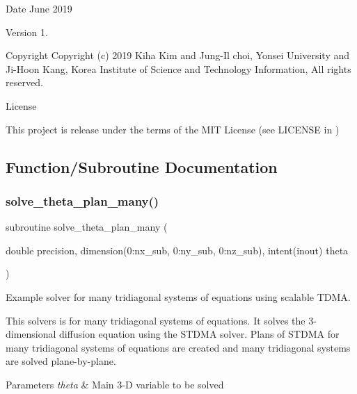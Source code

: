 \begin{DoxyDate}{Date}
June 2019 
\end{DoxyDate}
\begin{DoxyVersion}{Version}
1. 
\end{DoxyVersion}
\begin{DoxyParagraph}{Copyright}
Copyright (c) 2019 Kiha Kim and Jung-\/\+Il choi, Yonsei University and Ji-\/\+Hoon Kang, Korea Institute of Science and Technology Information, All rights reserved. 
\end{DoxyParagraph}
\begin{DoxyParagraph}{License }

\end{DoxyParagraph}
This project is release under the terms of the M\+IT License (see L\+I\+C\+E\+N\+SE in ) 

\subsection{Function/\+Subroutine Documentation}
\mbox{\label{solve__theta__plan__many_8f90_af048018fcdfbe66e00922dee3e7e9a64}} 
\subsubsection{\texorpdfstring{solve\_theta\_plan\_many()}{solve\_theta\_plan\_many()}}
{\footnotesize\ttfamily subroutine solve\+\_\+theta\+\_\+plan\+\_\+many (\begin{DoxyParamCaption}\item[{double precision, dimension(0\+:nx\+\_\+sub, 0\+:ny\+\_\+sub, 0\+:nz\+\_\+sub), intent(inout)}]{theta }\end{DoxyParamCaption})}



Example solver for many tridiagonal systems of equations using scalable T\+D\+MA. 

This solvers is for many tridiagonal systems of equations. It solves the 3-\/dimensional diffusion equation using the S\+T\+D\+MA solver. Plans of S\+T\+D\+MA for many tridiagonal systems of equations are created and many tridiagonal systems are solved plane-\/by-\/plane. 
\begin{DoxyParams}{Parameters}
{\em theta} & Main 3-\/D variable to be solved \\
\hline
\end{DoxyParams}



